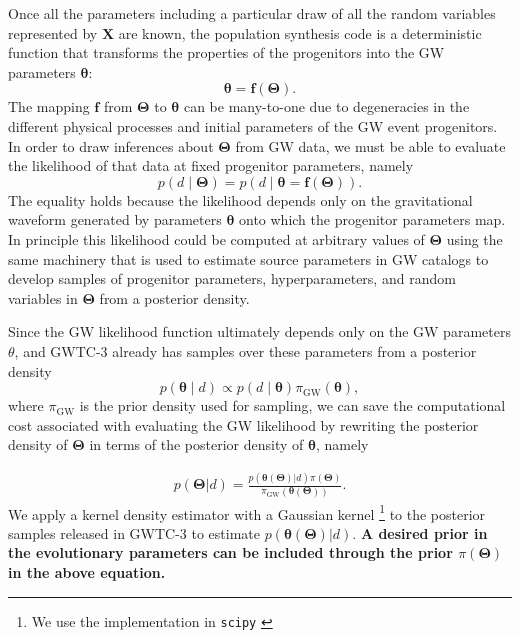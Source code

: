 \documentclass[twocolumn]{aastex631}
\begin{document}
Once all the parameters including a particular draw of all the random variables
represented by $\bm{X}$ are known, the population synthesis code is a
deterministic function that transforms the properties of the progenitors into
the GW parameters $\bm{\theta}$:
\begin{equation}
    \bm{\theta} = \bm{f}\left( \bm{\Theta} \right).
\end{equation}
The mapping $\bm{f}$ from $\bm{\Theta}$ to $\bm{\theta}$ can be many-to-one due
to degeneracies in the different physical processes and initial parameters of
the GW event progenitors. In order to draw inferences about $\bm{\Theta}$ from
GW data, we must be able to evaluate the likelihood of that data at fixed
progenitor parameters, namely
\begin{equation}
    p\left( d \mid \bm{\Theta} \right) = p\left( d \mid \bm{\theta} = \bm{f}\left( \bm{\Theta} \right) \right).
\end{equation}
The equality holds because the likelihood depends only on the gravitational
waveform generated by parameters $\bm{\theta}$ onto which the progenitor
parameters map.  In principle this likelihood could be computed at arbitrary
values of $\bm{\Theta}$ using the same machinery that is used to estimate source
parameters in GW catalogs \citep{Veitch2015,Ashton2019,Romero-Shaw2020,GWTC-3}
to develop samples of progenitor parameters, hyperparameters, and random
variables in $\bm{\Theta}$ from a posterior density.

Since the GW likelihood function ultimately depends only on the GW parameters
$\theta$, and GWTC-3 already has samples over these parameters from a posterior
density
\begin{equation}
    p\left( \bm{\theta} \mid d \right) \propto p\left( d \mid \bm{\theta} \right) \pi_\mathrm{GW} \left( \bm{\theta} \right),
\end{equation}
where $\pi_\mathrm{GW}$ is the prior density used for sampling, we can save the
computational cost associated with evaluating the GW likelihood by rewriting the
posterior density of $\bm{\Theta}$ in terms of the posterior density of
$\bm{\theta}$, namely

\begin{align}
    p(\bm{\Theta} | d) = \frac{p(\bm{\theta}(\bm{\Theta})| d) \pi(\bm{\Theta})}{\pi_\mathrm{GW}(\bm{\theta}(\bm{\Theta}))}.
\end{align}
We apply a kernel density estimator with a Gaussian kernel \footnote{We use the
implementation in \texttt{scipy} \cite{2020SciPy-NMeth}} to the posterior
samples released in GWTC-3 to estimate $p(\bm{\theta}(\bm{\Theta})|d)$.
\textbf{A desired prior in the evolutionary parameters can be included through
the prior $\pi(\bm{\Theta})$ in the above equation.}
\end{document}
